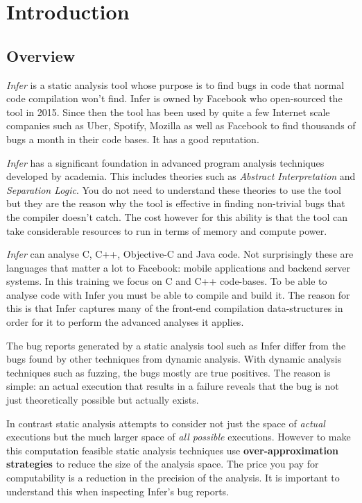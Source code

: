 \section{Introduction}

\subsection{Overview}

\textit{Infer} is a static analysis tool whose purpose
is to find bugs in code that normal code compilation won't find.
Infer is owned by Facebook who open-sourced the tool in 2015.
Since then the tool has been used by quite a few Internet scale companies
such as Uber, Spotify, Mozilla as well as Facebook to find thousands of bugs 
a month in their code bases. It has a good reputation.

\textit{Infer} has a significant foundation in advanced program analysis techniques
developed by academia. This includes theories such as \textit{Abstract Interpretation} and 
\textit{Separation Logic}. You do not need to understand these theories to use the tool
but they are the reason why the tool is effective in finding non-trivial bugs 
that the compiler doesn't catch. The cost however for this ability is that the
tool can take considerable resources to run in terms of memory and compute power.

\textit{Infer} can analyse C, C++, Objective-C and Java code. Not surprisingly
these are languages that matter a lot to Facebook: mobile applications and backend
server systems. In this training we focus on C and C++ code-bases. To be able to analyse
code with Infer you must be able to compile and build it. The reason for this is
that Infer captures many of the front-end compilation data-structures in order
for it to perform the advanced analyses it applies.

The bug reports generated by a static analysis tool such as Infer differ from 
the bugs found by other techniques from dynamic analysis. With dynamic analysis
techniques such as fuzzing, the bugs mostly are true positives. 
The reason is simple: an actual execution that results in a failure reveals
that the bug is not just theoretically possible but actually exists.

In contrast static analysis attempts to consider not just the space of \textit{actual} executions
but the much larger space of \textit{all possible} executions.
However to make this computation feasible static analysis techniques use
\textbf{over-approximation strategies} to reduce the size of the analysis space. 
The price you pay for computability is a reduction in the precision of the
analysis. It is important to understand this when inspecting Infer's bug reports.

